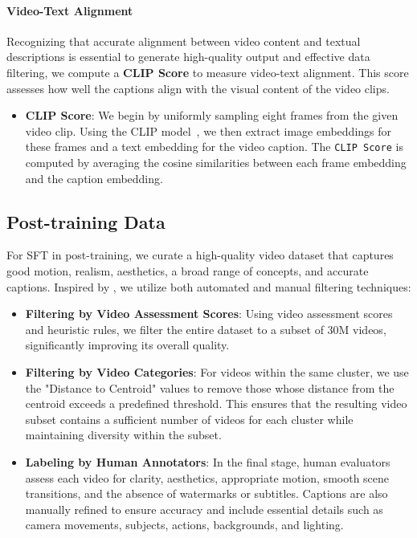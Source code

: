 \paragraph{Video-Text Alignment}

Recognizing that accurate alignment between video content and textual descriptions is essential to generate high-quality output and effective data filtering, we compute a \textbf{CLIP Score} to measure video-text alignment. This score assesses how well the captions align with the visual content of the video clips.

\begin{itemize}[left=0cm] 
\item \textbf{CLIP Score}: We begin by uniformly sampling eight frames from the given video clip. Using the CLIP model~\cite{yang2022chineseclip}, we then extract image embeddings for these frames and a text embedding for the video caption. The \texttt{CLIP Score} is computed by averaging the cosine similarities between each frame embedding and the caption embedding.



\end{itemize}


\subsection{Post-training Data}


For SFT in post-training, we curate a high-quality video dataset that captures good motion, realism, aesthetics, a broad range of concepts, and accurate captions. Inspired by \cite{dai2023emu, polyak2024moviegencastmedia, kong2024hunyuanvideo}, we utilize both automated and manual filtering techniques:

\begin{itemize}[left=0cm]


\item \textbf{Filtering by Video Assessment Scores}: Using video assessment scores and heuristic rules, we filter the entire dataset to a subset of 30M videos, significantly improving its overall quality.


\item \textbf{Filtering by Video Categories}: For videos within the same cluster, we use the "Distance to Centroid" values to remove those whose distance from the centroid exceeds a predefined threshold. This ensures that the resulting video subset contains a sufficient number of videos for each cluster while maintaining diversity within the subset.



\item \textbf{Labeling by Human Annotators}: In the final stage, human evaluators assess each video for clarity, aesthetics, appropriate motion, smooth scene transitions, and the absence of watermarks or subtitles. Captions are also manually refined to ensure accuracy and include essential details such as camera movements, subjects, actions, backgrounds, and lighting.

\end{itemize}


